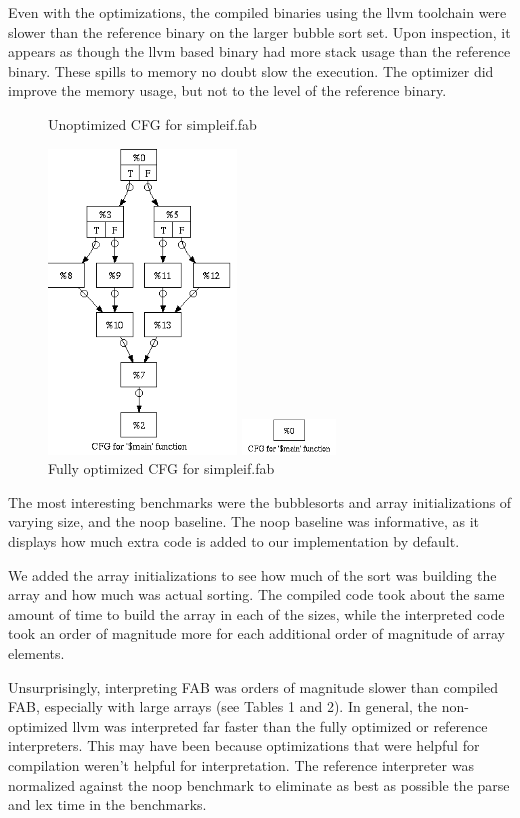 \documentclass[11pt]{article} %
\begin{document}
Even with the optimizations, the compiled binaries using the llvm toolchain were slower than the reference binary on the larger bubble sort set. Upon inspection, it appears as though the llvm based binary had more stack usage than the reference binary. These spills to memory no doubt slow the execution. The optimizer did improve the memory usage, but not to the level of the reference binary.

\begin{figure}[h!]
\caption{Unoptimized CFG for simpleif.fab}
\centering
\includegraphics[width=50mm]{noOpt.png}
\caption{Fully optimized CFG for simpleif.fab}
\centering
\includegraphics[width=25mm]{fullOpt.png}
\end{figure}

The most interesting benchmarks were the bubblesorts and array initializations of varying size, and the noop baseline. The noop baseline was informative, as it displays how much extra code is added to our implementation by default. 

We added the array initializations to see how much of the sort was building the array and how much was actual sorting. The compiled code took about the same amount of time to build the array in each of the sizes, while the interpreted code took an order of magnitude more for each additional order of magnitude of array elements.

Unsurprisingly, interpreting FAB was orders of magnitude slower than compiled FAB, especially with large arrays (see Tables 1 and 2). In general, the non-optimized llvm was interpreted far faster than the fully optimized or reference interpreters. This may have been because optimizations that were helpful for compilation weren't helpful for interpretation. The reference interpreter was normalized against the noop benchmark to eliminate as best as possible the parse and lex time in the benchmarks.
\end{document}
